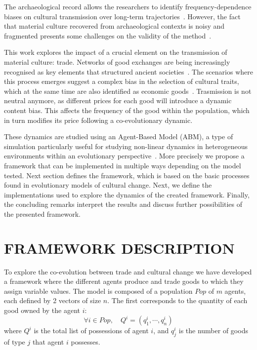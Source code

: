\documentclass{wscpaperproc}
\begin{document}
The archaeological record allows the researchers to identify frequency-dependence biases on cultural transmission over long-term trajectories~\cite{lipo_neutralitystyle_2001,shennan_ceramic_2001,steele_ceramic_2010}. However, the fact that material culture recovered from archaeological contexts is noisy and fragmented presents some challenges on the validity of the method~\cite{kandler_nonequilibrium_2013,porcic_exploring_2014,crema_approximate_2014}.

This work explores the impact of a crucial element on the transmission of material culture: trade. Networks of good exchanges are being increasingly recognised as key elements that structured ancient societies~. The scenarios where this process emerges suggest a complex bias in the selection of cultural traits, which at the same time are also identified as economic goods~\cite{bentley_specialisation_2005,macmillan_agent-based_2008}. Trasmission is not neutral anymore, as different prices for each good will introduce a dynamic content bias. This affects the frequency of the good within the population, which in turn modifies its price following a co-evolutionary dynamic.

These dynamics are studied using an Agent-Based Model (ABM), a type of simulation particularly useful for studying non-linear dynamics in heterogeneous environments within an evolutionary perspective~\cite{lake_trends_2014}. More precisely we propose a framework that can be implemented in multiple ways depending on the model tested. Next section defines the framework, which is based on the basic processes found in evolutionary models of cultural change. Next, we define the implementations used to explore the dynamics of the created framework. Finally, the concluding remarks interpret the results and discuss further possibilities of the presented framework.

\section{FRAMEWORK DESCRIPTION}

To explore the co-evolution between trade and cultural change we have developed a framework where the different agents produce and trade goods to which they assign variable values. The model is composed of a population $Pop$ of $m$ agents, each defined by 2 vectors of size $n$. The first corresponds to the quantity of each good owned by the agent $i$: 
$$\forall i \in Pop, \quad Q^i = (q^i_1,\cdots,q^i_n) $$
where $Q^i$ is the total list of possessions of agent $i$, and $q^i_j$ is the number of goods of type $j$ that agent $i$ possesses.
\end{document}
